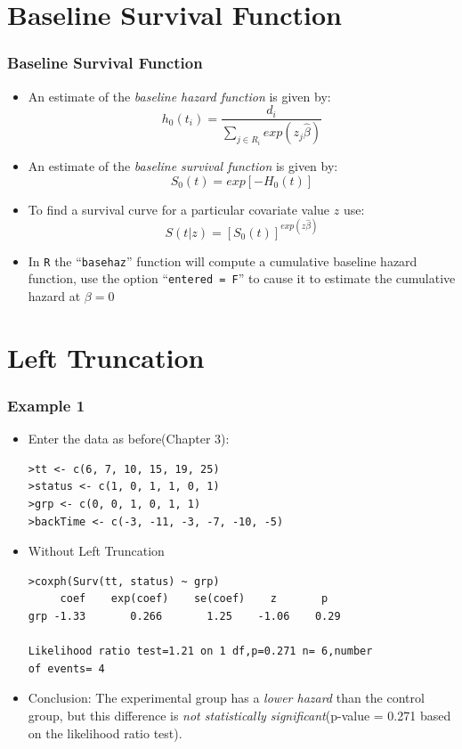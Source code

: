 \documentclass{beamer}
\newcommand{\empr}[1]{{\emph{\color{red}#1}}}
\begin{document}
\section{Baseline Survival Function}
\begin{frame}
\frametitle{Baseline Survival Function}
\begin{itemize}
\item An estimate of the \empr{baseline hazard function} is given by:
\begin{equation}
h_0(t_i) = \frac{d_i}{\sum\limits_{j\in R_i}{} exp(z_j\hat{\beta})}
\end{equation}
\item An estimate of the \empr{baseline survival function} is given by:
\begin{equation}
S_0(t) = exp[-H_0(t)]
\end{equation}
\item To find a survival curve for a particular covariate value $z$ use:
\begin{equation}
S(t|z) = [S_0(t)]^{exp(z\hat{\beta})}
\end{equation}
\item In \texttt{R} the ``\texttt{basehaz}'' function will compute a cumulative baseline hazard function, use the option ``\texttt{entered = F}'' to cause it to estimate the cumulative hazard at $\beta = 0$
\end{itemize}
\end{frame}


\section{Left Truncation}
\begin{frame}[fragile]
\frametitle{Example 1}
\begin{itemize}
\item Enter the data as before(Chapter 3):
\begin{Verbatim}
>tt <- c(6, 7, 10, 15, 19, 25)
>status <- c(1, 0, 1, 1, 0, 1)
>grp <- c(0, 0, 1, 0, 1, 1)
>backTime <- c(-3, -11, -3, -7, -10, -5)
\end{Verbatim}
\item Without {\color{red}Left Truncation}
\begin{Verbatim}
>coxph(Surv(tt, status) ~ grp)
     coef    exp(coef)    se(coef)    z       p 
grp -1.33       0.266       1.25    -1.06    0.29

Likelihood ratio test=1.21 on 1 df,p=0.271 n= 6,number 
of events= 4
\end{Verbatim}
\item Conclusion: The experimental group has a \empr{lower hazard} than the control group, but this difference is \empr{not statistically significant}(p-value = 0.271 based on the likelihood ratio test).
\end{itemize}
\end{frame}
\end{document}
